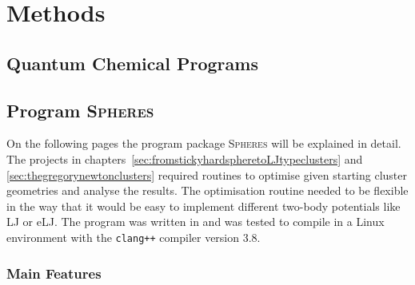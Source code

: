
\part{Methods}
\label{sec:methods}

\chapter{Quantum Chemical Programs}
\label{sec:quantumchemicalprograms}

\chapter{Program \textsc{Spheres}}
\label{sec:theprogramspheres}

On the following pages the program package \textsc{Spheres} will be explained
in detail. The projects in
chapters~\ref{sec:fromstickyhardspheretoLJtypeclusters} and
\ref{sec:thegregorynewtonclusters} required routines to optimise given starting
cluster geometries and analyse the results. The optimisation routine needed to
be flexible in the way that it would be easy to implement different two-body
potentials like \ac{LJ} or \ac{eLJ}. The program was written in \Cpp
and was tested to compile in a Linux environment with the \texttt{clang++}
compiler version 3.8.

\section{Main Features}
\label{sec:generalstructure}

